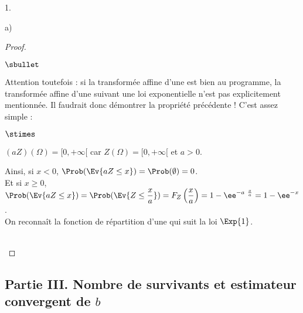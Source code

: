 \documentclass[11pt]{article}%
\begin{document}
\begin{noliste}{1.}
\begin{noliste}{a)}
\begin{proof}
\begin{remark}
\begin{noliste}{$\sbullet$}
        \item Attention toutefois : si la transformée affine d'une
          \var est bien au programme, la transformée affine d'une \var
          suivant une loi exponentielle n'est pas explicitement
          mentionnée. Il faudrait donc démontrer la propriété
          précédente ! C'est assez simple :
          \begin{noliste}{$\stimes$}
          \item $(aZ) (\Omega) = [0, +\infty[$ car $Z(\Omega) = [0,
            +\infty[$ et $a > 0$.
          \item Ainsi, si $x < 0$, $\Prob(\Ev{aZ \leq x}) =
            \Prob(\emptyset) = 0$.\\
            Et si $x \geq 0$, $\Prob(\Ev{aZ \leq x}) = \Prob(\Ev{Z
              \leq \dfrac{x}{a}}) = F_Z\left( \dfrac{x}{a} \right) = 1
            - \ee^{- a \ \frac{x}{a}} = 1 - \ee^{-x}$.\\
            On reconnaît la fonction de répartition d'une \var qui
            suit la loi $\Exp{1}$.            
          \end{noliste}
        \end{noliste}
      \end{remark}~\\[-1.4cm]
    \end{proof}
  \end{noliste}
\end{noliste}
  

\newpage


\subsection*{Partie III. Nombre de survivants et estimateur convergent de $b$}
\end{document}
